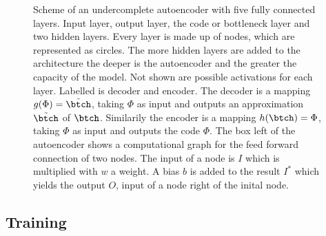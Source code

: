 \begin{figure}
	\centering
	
	\caption{\footnotesize Scheme of an undercomplete autoencoder with five fully connected layers. Input layer, output layer, the code or bottleneck layer and two hidden layers. Every layer is made up of nodes, which are represented as circles. The more hidden layers are added to the architecture the deeper is the autoencoder and the greater the capacity of the model. Not shown are possible activations for each layer. Labelled is decoder and encoder. The decoder is a mapping \(g(\Phi)=\tilde{\btch}\), taking \(\Phi\) as input and outputs an approximation \(\tilde{\btch}\) of \(\btch\). Similarily the encoder is a mapping \(h(\btch)=\Phi\), taking \(\Phi\) as input and outputs the code \(\Phi\). The box left of the autoencoder shows a computational graph for the feed forward connection of two nodes. The input of a node is \(I\) which is multiplied with \(w\) a weight. A bias \(b\) is added to the result \(I^*\) which yields the output \(O\), input of a node right of the inital node.}
	\label{Fig:Autoencoder}
\end{figure}
\subsection{Training}

